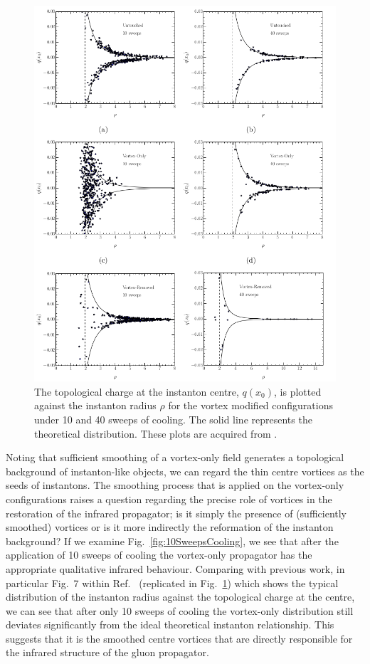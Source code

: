 %
\begin{figure}[htb!]
\centering
\includegraphics[width=\linewidth]{./Instanton_Radius.png}
\caption{\label{fig:InstantonRadius} The topological charge at the instanton centre, $q(x_0)$, is plotted against the instanton radius $\rho$ for the vortex modified configurations under 10 and 40 sweeps of cooling. The solid line represents the theoretical distribution. These plots are acquired from \citet{Trewartha:2015ida}.}
\end{figure}
%
Noting that sufficient smoothing of a vortex-only field generates a topological background of instanton-like objects, we can regard the thin centre vortices as the seeds of instantons. The smoothing process that is applied on the vortex-only configurations raises a question regarding the precise role of vortices in the restoration of the infrared propagator; is it simply the presence of (sufficiently smoothed) vortices or is it more indirectly the reformation of the instanton background? If we examine Fig.~\ref{fig:10SweepsCooling}, we see that after the application of 10 sweeps of cooling the vortex-only propagator has the appropriate qualitative infrared behaviour. Comparing with previous work, in particular Fig.~7 within Ref.~\cite{Trewartha:2015ida} (replicated in Fig.~\ref{fig:InstantonRadius}) which shows the typical distribution of the instanton radius against the topological charge at the centre, we can see that after only 10 sweeps of cooling the vortex-only distribution still deviates significantly from the ideal theoretical instanton relationship. This suggests that it is the smoothed centre vortices that are directly responsible for the infrared structure of the gluon propagator.